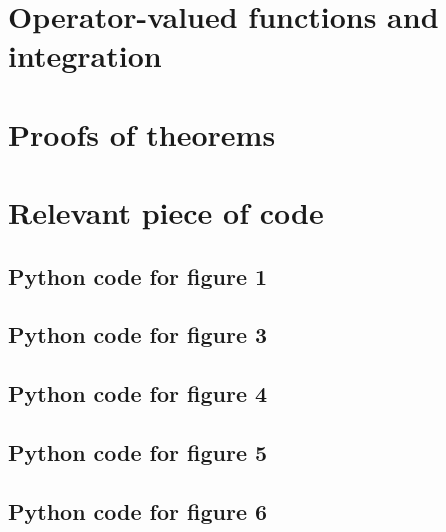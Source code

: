 
\chapter{Operator-valued functions and integration}
\label{ch:operator-valued_functions_and_integration}

\chapter{Proofs of theorems}
\label{ch:proof_of_theorems}


\chapter{Relevant piece of code}
\label{ch:relevant_piece_of_code}
\section{Python code for figure 1}
{\scriptsize
{}}

\section{Python code for figure 3}
{\scriptsize
{}}

\section{Python code for figure 4}
\label{code:efficient_decomposable_gaussian}
{\scriptsize
{}}


\section{Python code for figure 5}
\label{code:efficient_curlfree_gaussian}
{\scriptsize
{}}

\section{Python code for figure 6}
\label{code:efficient_divfree_gaussian}
{\scriptsize
{}}


